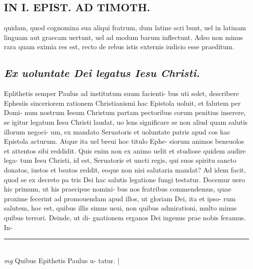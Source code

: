 \documentclass{article}
\begin{document}
\begin{pages}
\section*{IN I. EPIST. AD TIMOTH. }
\marginpar{[ p.compa- ]}\pstart quidam, quod cognomina sua aliqui fratrum, dum latine scri bunt, uel in latinam linguam aut graecam uertunt, uel ad modum barum inflectunt. Adeo non minus rara quam eximia res est, recto de rebus istis externis iudicio esse praeditum.   \pend
{}
{}
\subsection*{\textit{Ex uoluntate Dei legatus Iesu Christi. }}\pstart Eplithetis semper Paulus ad institutum suum facienti- bus uti solet, describere Ephesiis sinceriorem rationem Christianismi hac Epistola uoluit, et falutem per Domi- num nostrum Iesum Christum partam pectoribus   corum penitius inserere, se igitur legatum Iesu Christi laudat, uo lens significare se non aliud quam salutis illorum negoci- um, ex mandato Seruatoris et uoluntate patris apud cos hac Epistola acturum.  Atque ita uel breui hoc titulo Ephe- siorum animos beneuolos et attentos sibi reddidit.  Quis enim non ex animo uelit et studiose quidem audire lega- tum Iesu Christi, id est, Seruatoris et uncti regis, qui suos spiritu sancto donatos, iustos et beatos reddit, eoque non nisi salutaria mandat? Ad idem facit, quod se ex decreto pa tris Dei hac salutis legatione fungi testatur.   \pend\pstart Docemur uero hic primum, ut his praecipue nomini- bus nos fratribus commendemus, quae proxime fecerint ad promouendam apud illos, ut gloriam Dei, ita et ipso- rum salutem, hoc est, quibus illis simus usui, non quibus admirationi, multo minus quibus terrori.  Deinde, ut di- gnationem erganos Dei ingenue prae nobis feramus.  In-  \pend\pstart  \pend
\vspace{0.5cm}\noindent
\vspace{0.2cm}\rule{1cm}{0.2pt}\\ 
\hspace{0.2cm}\textit{mg}
\footnotesize Quibus Epithetis Paulus u- tatur.  
\normalsize| 

\end{pages}
\end{document}
